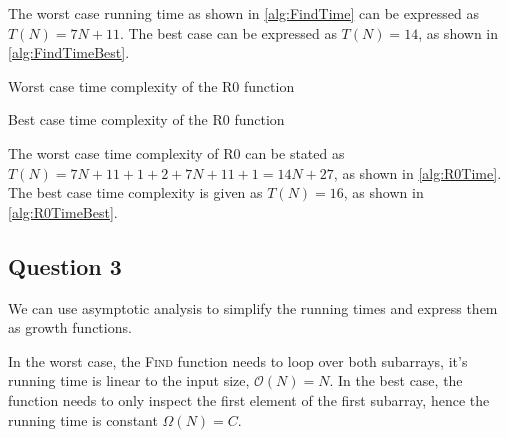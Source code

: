 The worst case running time as shown in \autoref{alg:FindTime} can be expressed as $T(N) = 7N + 11$. The best case can be expressed as $T(N) = 14$, as shown in \autoref{alg:FindTimeBest}.

\begin{algorithm}[H]
    \caption{Worst case time complexity of the R0 function}\label{alg:R0Time}
    \begin{algorithmic}
         \qquad {}
         \qquad  {}
         \qquad {}
        \EndIf{}
         \qquad {}
        \EndFunction{}
    \end{algorithmic}
\end{algorithm}

\begin{algorithm}[H]
    \caption{Best case time complexity of the R0 function}\label{alg:R0TimeBest}
    \begin{algorithmic}
        \qquad {}
        \qquad {}
         \qquad {}
        \EndIf{}
         \qquad {}
        \EndFunction{}
    \end{algorithmic}
\end{algorithm}

The worst case time complexity of \textsc{R0} can be stated as $T(N) = 7N + 11 + 1 + 2 + 7N + 11 + 1 = 14N + 27$, as shown in \autoref{alg:R0Time}. The best case time complexity is given as $T(N) = 16$, as shown in \autoref{alg:R0TimeBest}.


\subsection{Question 3}

We can use asymptotic analysis to simplify the running times and express them as growth functions.

In the worst case, the \textsc{Find} function needs to loop over both subarrays, it's running time is linear to the input size, $\mathcal{O}(N) = N$. In the best case, the function needs to only inspect the first element of the first subarray, hence the running time is constant $\Omega(N) = C$.

